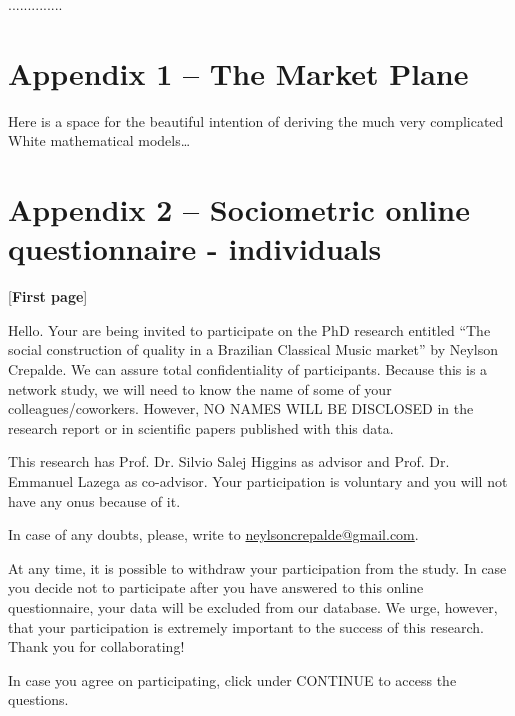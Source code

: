 \documentclass[a4paper, 12pt, openright, oneside, german, french, brazil, english]{abntex2}
\begin{document}
        ..............









        
	
	
\postextual
\anexos

	


	\newpage
	\chapter*[Market Plane]{Appendix 1 -- The Market Plane}
	Here is a space for the beautiful intention of deriving the much very complicated White mathematical models\dots

        \newpage

        \chapter*[Questionnaire - individuals]{Appendix 2 -- Sociometric online questionnaire - individuals}

        [\textbf{First page}]
        
        Hello. Your are being invited to participate on the PhD research entitled ``The social construction of quality in a Brazilian Classical Music market'' by Neylson Crepalde. We can assure total confidentiality of participants. Because this is a network study, we will need to know the name of some of your colleagues/coworkers. However, NO NAMES WILL BE DISCLOSED in the research report or in scientific papers published with this data.

        This research has Prof. Dr. Silvio Salej Higgins as advisor and Prof. Dr. Emmanuel Lazega as co-advisor. Your participation is voluntary and you will not have any onus because of it.

        In case of any doubts, please, write to \url{neylsoncrepalde@gmail.com}.

        At any time, it is possible to withdraw your participation from the study. In case you decide not to participate after you have answered to this online questionnaire, your data will be excluded from our database. We urge, however, that your participation is extremely important to the success of this research. Thank you for collaborating!

        In case you agree on participating, click under CONTINUE to access the questions.
\end{document}
